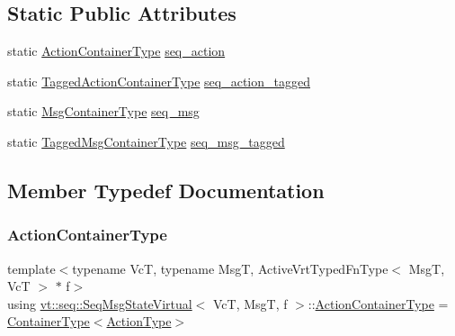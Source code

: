 \subsection*{Static Public Attributes}
\begin{DoxyCompactItemize}
\item 
static \hyperlink{structvt_1_1seq_1_1_seq_msg_state_virtual_aa60e119bc842980c949be50663b04b7a}{Action\+Container\+Type} \hyperlink{structvt_1_1seq_1_1_seq_msg_state_virtual_ae0a3ff39e7edb7e47ffaae528823e76c}{seq\+\_\+action}
\item 
static \hyperlink{structvt_1_1seq_1_1_seq_msg_state_virtual_a1298c226eeddc2e8fbd58bf1b92ef2aa}{Tagged\+Action\+Container\+Type} \hyperlink{structvt_1_1seq_1_1_seq_msg_state_virtual_aaa24831f6dc9810cb8e2b8aac13ce77d}{seq\+\_\+action\+\_\+tagged}
\item 
static \hyperlink{structvt_1_1seq_1_1_seq_msg_state_virtual_a04ba59629edd91369fb4dcb17784c370}{Msg\+Container\+Type} \hyperlink{structvt_1_1seq_1_1_seq_msg_state_virtual_a54746af8c25caba7b053524f19201e72}{seq\+\_\+msg}
\item 
static \hyperlink{structvt_1_1seq_1_1_seq_msg_state_virtual_a9760353cffc9071f3e24054562a86db3}{Tagged\+Msg\+Container\+Type} \hyperlink{structvt_1_1seq_1_1_seq_msg_state_virtual_af7c7ba482e8b8833b9a92614150bffd0}{seq\+\_\+msg\+\_\+tagged}
\end{DoxyCompactItemize}


\subsection{Member Typedef Documentation}
\mbox{\label{structvt_1_1seq_1_1_seq_msg_state_virtual_aa60e119bc842980c949be50663b04b7a}} 
\subsubsection{\texorpdfstring{Action\+Container\+Type}{ActionContainerType}}
{\footnotesize\ttfamily template$<$typename VcT, typename MsgT, Active\+Vrt\+Typed\+Fn\+Type$<$ Msg\+T, Vc\+T $>$ $\ast$ f$>$ \\
using \hyperlink{structvt_1_1seq_1_1_seq_msg_state_virtual}{vt\+::seq\+::\+Seq\+Msg\+State\+Virtual}$<$ VcT, MsgT, f $>$\+::\hyperlink{structvt_1_1seq_1_1_seq_msg_state_virtual_aa60e119bc842980c949be50663b04b7a}{Action\+Container\+Type} =  \hyperlink{structvt_1_1seq_1_1_seq_msg_state_virtual_a271216687b589ec1d08d4da5cdbb5177}{Container\+Type}$<$\hyperlink{structvt_1_1seq_1_1_seq_msg_state_virtual_a9b86c445166e8484a5e275caf8a22f8c}{Action\+Type}$>$}

